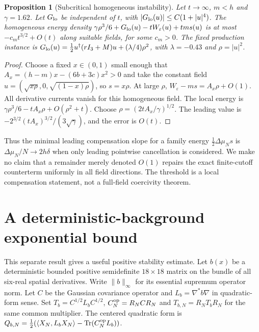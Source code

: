 \documentclass[11pt]{article}
\newtheorem{proposition}[theorem]{Proposition}
\newcommand{\tr}{\operatorname{Tr}}
\newcommand{\eps}{\varepsilon}
\newcommand{\la}[1]{\langle #1\rangle}
\begin{document}
\begin{proposition}[Subcritical homogeneous instability]\label{prop:instability}
Let $t\to\infty$, $m<h$ and $\gamma=1.62$. Let $G_{\rm lo}$ be independent
of $t$, with $|G_{\rm lo}(u)|\le C(1+|u|^4)$.
The homogeneous energy density
$\gamma\rho^3/6+G_{\rm lo}(u)-tW_\eps(u)+tms(u)$
is at most $-c_m t^{3/2}+O(t)$ along suitable fields, for some $c_m>0$.
The fixed production instance is
$G_{\rm lo}(u)=\tfrac12u^\dagger(rI_3+M)u+(\lambda/4)\rho^2$,
with $\lambda=-0.43$ and $\rho=|u|^2$.
\end{proposition}
\begin{proof}
Choose a fixed $x\in(0,1)$ small enough that
$A_x=(h-m)x-(6b+3c)x^2>0$ and take the constant field
$u=(\sqrt{x\rho},0,\sqrt{(1-x)\rho})$, so $s=x\rho$.
At large $\rho$, $W_\eps-ms=A_x\rho+O(1)$.
All derivative currents vanish for this homogeneous field. The local
energy is $\gamma\rho^3/6-tA_x\rho+O(\rho^2+t)$.
Choose $\rho=(2tA_x/\gamma)^{1/2}$. The leading value is
$-2^{3/2}(tA_x)^{3/2}/(3\sqrt\gamma)$, and the error is $O(t)$.
\end{proof}

Thus the minimal leading compensation slope for a family energy
$\tfrac12\Delta\mu_Ns$ is $\Delta\mu_N/N\to2h\delta$
when only leading pointwise cancellation is considered. We make no claim
that a remainder merely denoted $O(1)$ repairs the exact finite-cutoff
counterterm uniformly in all field directions. The threshold is a local
compensation statement, not a full-field coercivity theorem.

\section{A deterministic-background exponential bound}
This separate result gives a useful positive stability estimate. Let $b(x)$
be a deterministic bounded positive semidefinite $18\times18$ matrix on the
bundle of all six-real spatial derivatives. Write $\|b\|_\infty$ for its
essential supremum operator norm. Let $C$ be the Gaussian covariance operator
and $L_b=\nabla^*b\nabla$ in quadratic-form sense. Set
$T_b=C^{1/2}L_bC^{1/2}$, $C_N^{\rm op}=R_NCR_N$ and
$T_{b,N}=R_NT_bR_N$ for the same common multiplier.
The centered quadratic form is $Q_{b,N}=\tfrac12(\la{X_N,L_bX_N}
-\tr(C_N^{\rm op}L_b))$.
\end{document}
